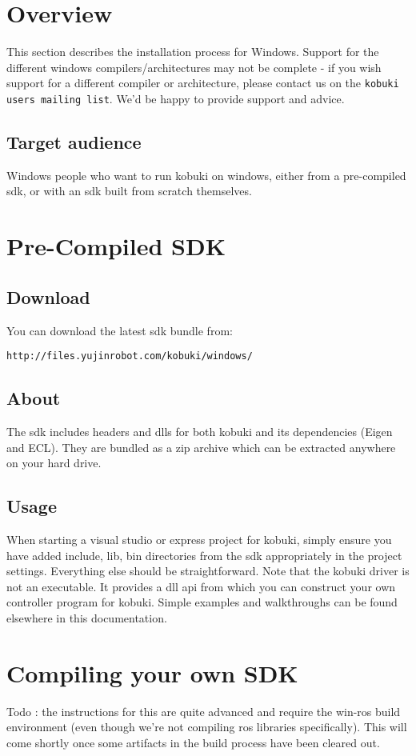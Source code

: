 \section{\-Overview}\label{koMainPage_Overview}
\-This section describes the installation process for \-Windows. \-Support for the different windows compilers/architectures may not be complete -\/ if you wish support for a different compiler or architecture, please contact us on the {\tt kobuki users mailing list}. \-We'd be happy to provide support and advice.\subsection{\-Target audience}\label{enMainPage_who}
\-Windows people who want to run kobuki on windows, either from a pre-\/compiled sdk, or with an sdk built from scratch themselves.\section{\-Pre-\/\-Compiled S\-D\-K}\label{enInstallationWindowsGuide_precompiledSDK}
\subsection{\-Download}\label{enInstallationWindowsGuide_sdkDownload}
\-You can download the latest sdk bundle from\-:

{\tt http\-://files.\-yujinrobot.\-com/kobuki/windows/}\subsection{\-About}\label{enInstallationWindowsGuide_About}
\-The sdk includes headers and dlls for both kobuki and its dependencies (\-Eigen and \-E\-C\-L). \-They are bundled as a zip archive which can be extracted anywhere on your hard drive.\subsection{\-Usage}\label{enInstallationWindowsGuide_Usage}
\-When starting a visual studio or express project for kobuki, simply ensure you have added include, lib, bin directories from the sdk appropriately in the project settings. \-Everything else should be straightforward. \-Note that the kobuki driver is not an executable. \-It provides a dll api from which you can construct your own controller program for kobuki. \-Simple examples and walkthroughs can be found elsewhere in this documentation.\section{\-Compiling your own S\-D\-K}\label{enInstallationWindowsGuide_compilingSDK}
\-Todo \-: the instructions for this are quite advanced and require the win-\/ros build environment (even though we're not compiling ros libraries specifically). \-This will come shortly once some artifacts in the build process have been cleared out. 
